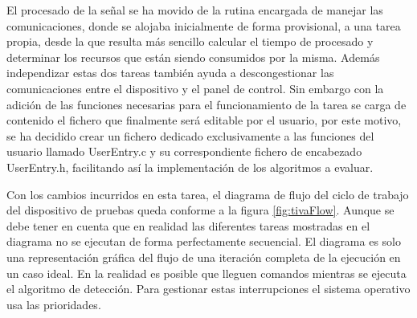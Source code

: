         El procesado de la señal se ha movido de la rutina encargada de manejar las comunicaciones, donde se alojaba inicialmente de forma provisional, a una tarea propia, desde la que resulta más sencillo calcular el tiempo de procesado y determinar los recursos que están siendo consumidos por la misma. Además independizar estas dos tareas también ayuda a descongestionar las comunicaciones entre el dispositivo y el panel de control. Sin embargo con la adición de las funciones necesarias para el funcionamiento de la tarea se carga de contenido el fichero que finalmente será editable por el usuario, por este motivo, se ha decidido crear un fichero dedicado exclusivamente a las funciones del usuario llamado UserEntry.c y su correspondiente fichero de encabezado UserEntry.h, facilitando así la implementación de los algoritmos a evaluar. 
        
        Con los cambios incurridos en esta tarea, el diagrama de flujo del ciclo de trabajo del dispositivo de pruebas queda conforme a la figura \ref{fig:tivaFlow}. Aunque se debe tener en cuenta que en realidad las diferentes tareas mostradas en el diagrama no se ejecutan de forma perfectamente secuencial. El diagrama es solo una representación gráfica del flujo de una iteración completa de la ejecución en un caso ideal. En la realidad es posible que lleguen comandos mientras se ejecuta el algoritmo de detección. Para gestionar estas interrupciones el sistema operativo usa las prioridades.
        
